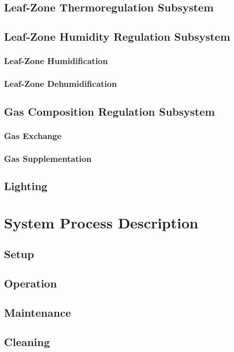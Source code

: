\documentclass{report}
\begin{document}
\subsection{Leaf-Zone Thermoregulation Subsystem}
\subsection{Leaf-Zone Humidity Regulation Subsystem}
\subsubsection{Leaf-Zone Humidification}
\subsubsection{Leaf-Zone Dehumidification}
\subsection{Gas Composition Regulation Subsystem}
\subsubsection{Gas Exchange}
\subsubsection{Gas Supplementation}
\subsection{Lighting}

\section{System Process Description}

\subsection{Setup}
\subsection{Operation}
\subsection{Maintenance}
\subsection{Cleaning}
\end{document}
